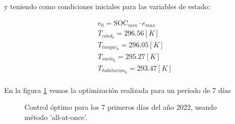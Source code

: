 y teniendo como condiciones iniciales para las variables de estado:

\begin{align}
	 & e_0 = \text{SOC}_{min} \cdot e_{max} \\
	 & T_{cond_0} = 296.56 [K]              \\
	 & T_{tanque_0} = 296.05[K]             \\
	 & T_{suelo_0} = 295.27[K]              \\
	 & T_{habitacion_0} = 293.47[K]         \\
\end{align}



En la figura \ref{fig:control_sand_7_days} vemos la optimización realizada
para un periodo de 7 días

\begin{figure}[h] \centering
	\centering
	
	\caption{Control óptimo para los 7 primeros días del año 2022, usando método 'all-at-once'.}
	\label{fig:control_sand_7_days}
\end{figure}
